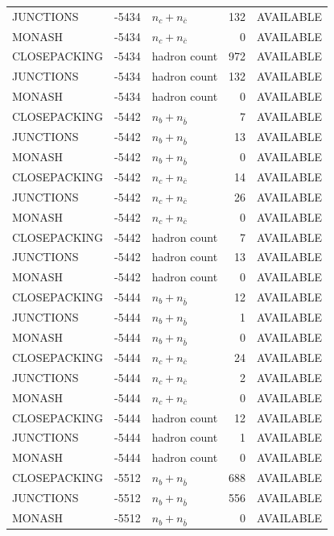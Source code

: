 \begin{landscape}
\begin{longtable}{@{}lrlrl@{}}
JUNCTIONS & -5434 & $n_c+n_{\bar c}$ & \num{132} & AVAILABLE \\
MONASH & -5434 & $n_c+n_{\bar c}$ & \num{0} & AVAILABLE \\
CLOSEPACKING & -5434 & hadron count & \num{972} & AVAILABLE \\
JUNCTIONS & -5434 & hadron count & \num{132} & AVAILABLE \\
MONASH & -5434 & hadron count & \num{0} & AVAILABLE \\
CLOSEPACKING & -5442 & $n_b+n_{\bar b}$ & \num{7} & AVAILABLE \\
JUNCTIONS & -5442 & $n_b+n_{\bar b}$ & \num{13} & AVAILABLE \\
MONASH & -5442 & $n_b+n_{\bar b}$ & \num{0} & AVAILABLE \\
CLOSEPACKING & -5442 & $n_c+n_{\bar c}$ & \num{14} & AVAILABLE \\
JUNCTIONS & -5442 & $n_c+n_{\bar c}$ & \num{26} & AVAILABLE \\
MONASH & -5442 & $n_c+n_{\bar c}$ & \num{0} & AVAILABLE \\
CLOSEPACKING & -5442 & hadron count & \num{7} & AVAILABLE \\
JUNCTIONS & -5442 & hadron count & \num{13} & AVAILABLE \\
MONASH & -5442 & hadron count & \num{0} & AVAILABLE \\
CLOSEPACKING & -5444 & $n_b+n_{\bar b}$ & \num{12} & AVAILABLE \\
JUNCTIONS & -5444 & $n_b+n_{\bar b}$ & \num{1} & AVAILABLE \\
MONASH & -5444 & $n_b+n_{\bar b}$ & \num{0} & AVAILABLE \\
CLOSEPACKING & -5444 & $n_c+n_{\bar c}$ & \num{24} & AVAILABLE \\
JUNCTIONS & -5444 & $n_c+n_{\bar c}$ & \num{2} & AVAILABLE \\
MONASH & -5444 & $n_c+n_{\bar c}$ & \num{0} & AVAILABLE \\
CLOSEPACKING & -5444 & hadron count & \num{12} & AVAILABLE \\
JUNCTIONS & -5444 & hadron count & \num{1} & AVAILABLE \\
MONASH & -5444 & hadron count & \num{0} & AVAILABLE \\
CLOSEPACKING & -5512 & $n_b+n_{\bar b}$ & \num{688} & AVAILABLE \\
JUNCTIONS & -5512 & $n_b+n_{\bar b}$ & \num{556} & AVAILABLE \\
MONASH & -5512 & $n_b+n_{\bar b}$ & \num{0} & AVAILABLE \\

\end{longtable}
\end{landscape}
